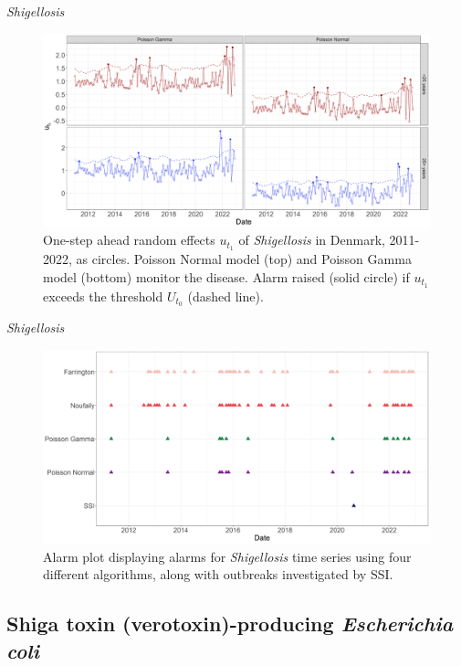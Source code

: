 \documentclass[aspectratio=169]{beamer}
\begin{document}
\begin{frame}{\emph{Shigellosis}}
\protect\hypertarget{shigellosis-1}{}
\tiny

\begin{figure}[H]
\includegraphics[width=0.7\linewidth]{../figures/Compare_novel_SHIG} \caption{One-step ahead random effects $u_{t_1}$ of \textit{Shigellosis} in Denmark, 2011-2022, as circles. Poisson Normal model (top) and Poisson Gamma model (bottom) monitor the disease. Alarm raised (solid circle) if $u_{t_1}$ exceeds the threshold $U_{t_0}$ (dashed line).}\label{fig:CompareNovelSHIG}
\end{figure}

\normalsize
\end{frame}

\begin{frame}{\emph{Shigellosis}}
\protect\hypertarget{shigellosis-2}{}
\tiny

\begin{figure}[H]
\includegraphics[width=0.7\linewidth]{../figures/Compare_alarms_SHIG} \caption{Alarm plot displaying alarms for \textit{Shigellosis} time series using four different algorithms, along with outbreaks investigated by SSI.}\label{fig:CompareAlarmsSHIG}
\end{figure}

\normalsize
\end{frame}

\hypertarget{shiga-toxin-verotoxin-producing-escherichia-coli}{%
\subsection{\texorpdfstring{Shiga toxin (verotoxin)-producing
\emph{Escherichia
coli}}{Shiga toxin (verotoxin)-producing Escherichia coli}}\label{shiga-toxin-verotoxin-producing-escherichia-coli}}
\end{document}
